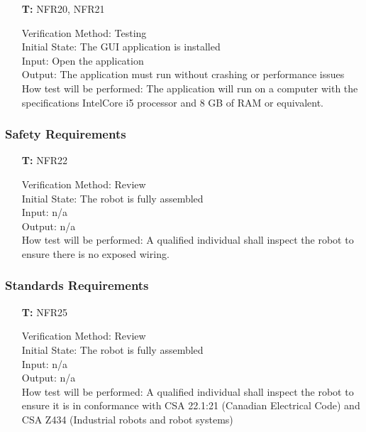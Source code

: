 \documentclass[12pt, titlepage]{article}
\newcounter{tnum} %
\begin{document}
\begin{itemize}

\item[\textbf{T\refstepcounter{tnum}\thetnum:}]{NFR20, NFR21\\}

Verification Method: Testing\\					
Initial State:  The GUI application is installed\\ 
Input: Open the application\\
Output: The application must run without crashing or performance issues\\
How test will be performed: The application will run on a computer with the specifications IntelCore i5 processor and 8 GB of RAM or equivalent.\\

\end{itemize}

\subsubsection{Safety Requirements}

\begin{itemize}

\item[\textbf{T\refstepcounter{tnum}\thetnum:}]{NFR22\\}

Verification Method: Review\\					
Initial State:  The robot is fully assembled\\
Input: n/a\\
Output: n/a\\
How test will be performed: A qualified individual shall inspect the robot to ensure there is no exposed wiring.\\

\end{itemize}

\subsubsection{Standards Requirements}

\begin{itemize}

\item[\textbf{T\refstepcounter{tnum}\thetnum:}]{NFR25\\}

Verification Method: Review\\					
Initial State:  The robot is fully assembled\\
Input: n/a\\
Output: n/a\\
How test will be performed: A qualified individual shall inspect the robot to ensure it is in conformance with CSA 22.1:21 (Canadian Electrical Code) \cite{CSA1} and CSA Z434 (Industrial robots and robot systems) \cite{CSA2}\\

\end{itemize}
\end{document}

